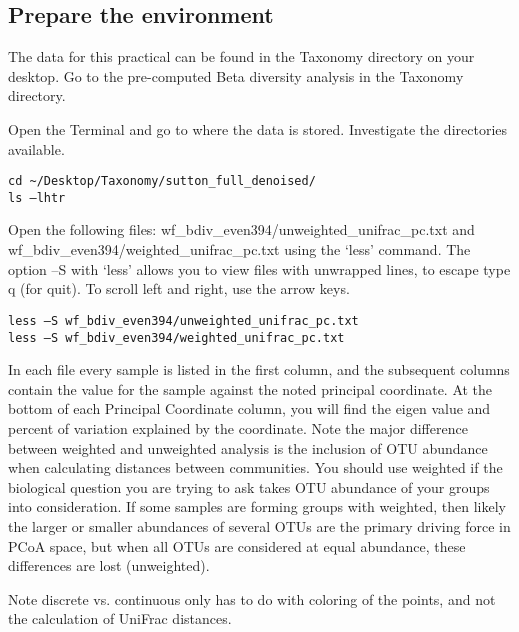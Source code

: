 \subsection{Prepare the environment}
The data for this practical can be found in the Taxonomy directory on your desktop. Go to the pre-computed Beta diversity analysis in the Taxonomy directory. 

\begin{steps}

Open the Terminal and go to where the data is stored. Investigate the directories available.

\begin{lstlisting}
cd ~/Desktop/Taxonomy/sutton_full_denoised/
ls –lhtr
\end{lstlisting}
\end{steps}

\begin{steps}
Open the following files:
wf\_bdiv\_even394/unweighted\_unifrac\_pc.txt and wf\_bdiv\_even394/weighted\_unifrac\_pc.txt 
using the ‘less’ command. The option –S with ‘less’ allows you to view files with unwrapped lines, to escape type q (for quit). To scroll left and right, use the arrow keys.
\begin{lstlisting}
less –S wf_bdiv_even394/unweighted_unifrac_pc.txt
less –S wf_bdiv_even394/weighted_unifrac_pc.txt
\end{lstlisting}
\end{steps}

In each file every sample is listed in the first column, and the subsequent columns contain the value for the sample against the noted principal coordinate. At the bottom of each Principal Coordinate column, you will find the eigen value and percent of variation explained by the coordinate. 
Note the major difference between weighted and unweighted analysis is the inclusion of OTU abundance when calculating distances between communities. You should use weighted if the biological question you are trying to ask takes OTU abundance of your groups into consideration. If some samples are forming groups with weighted, then likely the larger or smaller abundances of several OTUs are the primary driving force in PCoA space, but when all OTUs are considered at equal abundance, these differences are lost (unweighted).

Note discrete vs. continuous only has to do with coloring of the points, and not the calculation of UniFrac distances.


